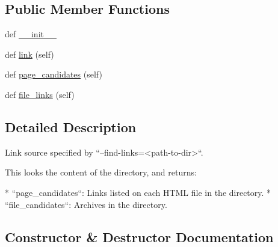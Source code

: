 \subsection*{Public Member Functions}
\begin{DoxyCompactItemize}
\item 
def \hyperlink{classpip_1_1__internal_1_1index_1_1sources_1_1__FlatDirectorySource_acc8261f4be308735054e5ea86f49db34}{\+\_\+\+\_\+init\+\_\+\+\_\+}
\item 
def \hyperlink{classpip_1_1__internal_1_1index_1_1sources_1_1__FlatDirectorySource_a979253d6f617879f1966a3ac3fcb34f0}{link} (self)
\item 
def \hyperlink{classpip_1_1__internal_1_1index_1_1sources_1_1__FlatDirectorySource_ae8fb96dd75e8d5711d8452249438d400}{page\+\_\+candidates} (self)
\item 
def \hyperlink{classpip_1_1__internal_1_1index_1_1sources_1_1__FlatDirectorySource_aff1d5e12fdb66b2dcad1c4d7155a965e}{file\+\_\+links} (self)
\end{DoxyCompactItemize}


\subsection{Detailed Description}
\begin{DoxyVerb}Link source specified by ``--find-links=<path-to-dir>``.

This looks the content of the directory, and returns:

* ``page_candidates``: Links listed on each HTML file in the directory.
* ``file_candidates``: Archives in the directory.
\end{DoxyVerb}
 

\subsection{Constructor \& Destructor Documentation}
\mbox{\label{classpip_1_1__internal_1_1index_1_1sources_1_1__FlatDirectorySource_acc8261f4be308735054e5ea86f49db34}} 

